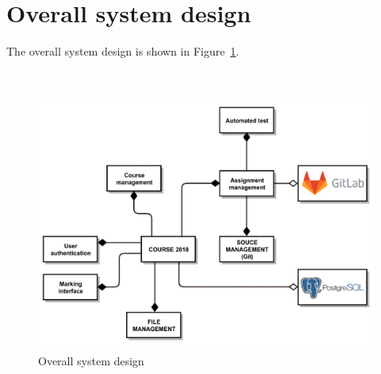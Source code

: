\pagebreak

\section{Overall system design}
The overall system design is shown in Figure~\ref{fig:SYSDES}.

\bigskip\ \\
\begin{figure}[ht]
    \centering
        \includegraphics[width=1.0\textwidth]{figures/sys-design}
    \caption{Overall system design}
    \label{fig:SYSDES}
\end{figure}